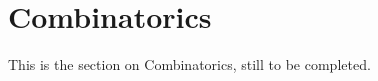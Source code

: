 \section{Combinatorics}\label{sec:combinatorics}

This is the section on Combinatorics, still to be completed.
